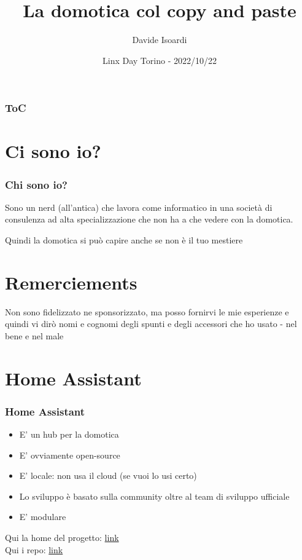 \documentclass[hyperref={pdfpagelabels=false}]{beamer}
\title{La domotica col copy and paste}
\author{Davide Isoardi}
\date{Linx Day Torino - 2022/10/22}
\newif\ifshowtoc
\begin{document}
	\begin{frame}
		\titlepage
	\end{frame} 
	
	
	\begin{frame}
		\frametitle{ToC}
		\tableofcontents[hidesubsections]
	\end{frame} 
	
	
	\section{Ci sono io?} 
	\begin{frame}
		\frametitle{Chi sono io?} 
		Sono un nerd (all'antica) che lavora come informatico in una società di consulenza ad alta specializzazione che non ha a che vedere con la domotica.
		
		Quindi la domotica si può capire anche se non è il tuo mestiere
	\end{frame}
	\showtocfalse%
	\section*{Remerciements}
	\begin{frame}
		\begin{block}{Non sono fidelizzato ne sponsorizzato, ma posso fornirvi le mie esperienze e quindi vi dirò nomi e cognomi degli spunti e degli accessori che ho usato - nel bene e nel male}
		\end{block}
	\end{frame}
	\section{Home Assistant}
	\begin{frame}
		\frametitle{Home Assistant}
		\begin{itemize}
			\item E' un hub per la domotica
			\item E' ovviamente open-source
			\item E' locale: non usa il cloud (se vuoi lo usi certo)
			\item Lo sviluppo è basato sulla community oltre al team di sviluppo ufficiale
			\item E' modulare
		\end{itemize}
		\medskip
		\normalsize Qui la home del progetto: \href{https://www.home-assistant.io/}{link}\\	\normalsize Qui i repo: \href{https://github.com/home-assistant}{link}
	\end{frame}
	
\end{document}
